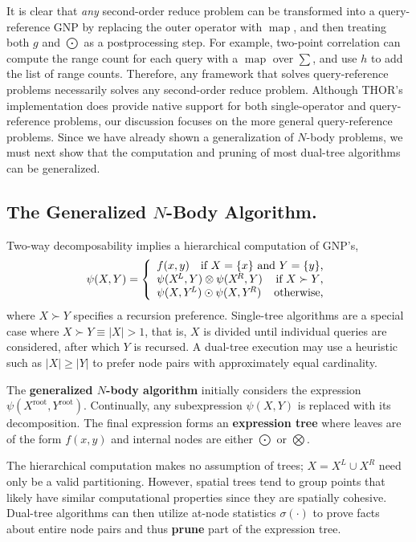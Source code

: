 \documentclass[twoside,leqno,twocolumn]{article}
\newcommand{\union}{\cup}
\newcommand{\prefsplit}[2]{#1 \succ #2}
\DeclareMathOperator*{\map}{map}
\newcommand{\gnp}{\psi}
\newcommand{\mysub}[1]{\subsection{#1.}}
\newcommand{\defterm}[1]{{\bf #1}}
\newcommand{\kdroot}[1]{#1^{\text{root}}}
\newcommand{\kdleft}[1]{#1^{\!L}}
\newcommand{\kdright}[1]{#1^{\!R}}
\newcommand{\outstat}{\sigma}
\begin{document}
It is clear that {\em any} second-order reduce problem can be transformed into a query-reference GNP by replacing the outer operator with $\map$, and then treating both $g$ and $\bigodot$ as a postprocessing step.
For example, two-point correlation can compute the range count for each query with a $\map$ over $\sum$, and use $h$ to add the list of range counts.
Therefore, any framework that solves query-reference problems necessarily solves any second-order reduce problem.
Although THOR's implementation does provide native support for both single-operator and query-reference problems, our discussion focuses on the more general query-reference problems.
Since we have already shown a generalization of $N$-body problems, we must next show that the computation and pruning of most dual-tree algorithms can be generalized.

\mysub{The Generalized $N$-Body Algorithm}
Two-way decomposability implies a hierarchical computation of GNP's,
\[
\gnp(X,Y) = \left\{ \begin{array}{lrr}
    f(x,y) & \multicolumn{2}{r}{\text{if }X = \{x\}\text{ and }Y = \{y\}\text{,}}
    \\
    \multicolumn{2}{l}{\gnp(\kdleft{X},Y) \otimes \gnp(\kdright{X}, Y)} & \text{if }\prefsplit{X}{Y}\text{,}
    \\
    \multicolumn{2}{l}{\gnp(X,\kdleft{Y}) \odot \gnp(X,\kdright{Y})} & \text{otherwise,}
  \end{array}
\right.
\]
\noindent
where $\prefsplit{X}{Y}$ specifies a recursion preference.
Single-tree algorithms are a special case where $\prefsplit{X}{Y} \equiv |X| > 1$, that is, $X$ is divided until individual queries are considered, after which $Y$ is recursed.
A dual-tree execution may use a heuristic such as $|X| \geq |Y|$ to prefer node pairs with approximately equal cardinality.

The \defterm{generalized $N$-body algorithm} initially considers the expression $\gnp(\kdroot{X}, \kdroot{Y})$.
Continually, any subexpression $\gnp(X, Y)$ is replaced with its decomposition.
The final expression forms an \defterm{expression tree} where leaves are of the form $f(x,y)$ and internal nodes are either $\bigodot$ or $\bigotimes$.

The hierarchical computation makes no assumption of trees; $X = \kdleft{X} \union \kdright{X}$ need only be a valid partitioning.
However, spatial trees tend to group points that likely have similar computational properties since they are spatially cohesive.
Dual-tree algorithms can then utilize at-node statistics $\outstat(\cdot)$ to prove facts about entire node pairs and thus \defterm{prune} part of the expression tree.
\end{document}
